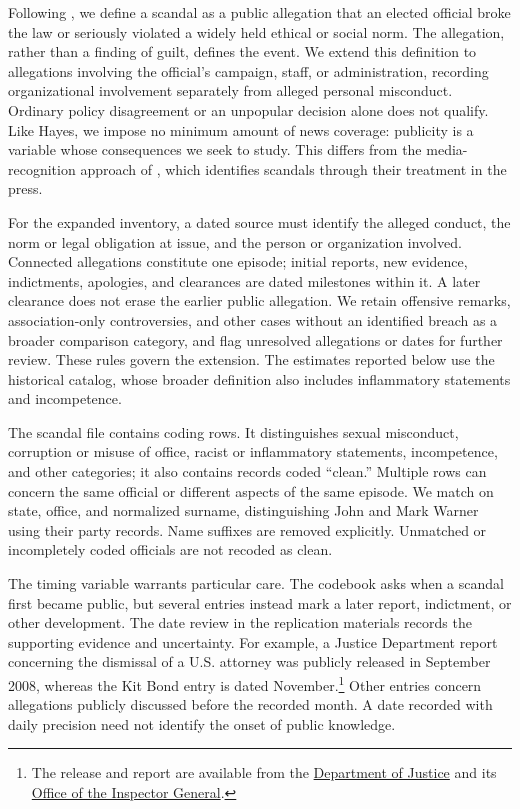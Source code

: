 \documentclass[11pt]{article}
\begin{document}
Following \citet{hayes2025}, we define a scandal as a public allegation that an elected official broke the law or seriously violated a widely held ethical or social norm. The allegation, rather than a finding of guilt, defines the event. We extend this definition to allegations involving the official's campaign, staff, or administration, recording organizational involvement separately from alleged personal misconduct. Ordinary policy disagreement or an unpopular decision alone does not qualify. Like Hayes, we impose no minimum amount of news coverage: publicity is a variable whose consequences we seek to study. This differs from the media-recognition approach of \citet{nyhan2017}, which identifies scandals through their treatment in the press.

For the expanded inventory, a dated source must identify the alleged conduct, the norm or legal obligation at issue, and the person or organization involved. Connected allegations constitute one episode; initial reports, new evidence, indictments, apologies, and clearances are dated milestones within it. A later clearance does not erase the earlier public allegation. We retain offensive remarks, association-only controversies, and other cases without an identified breach as a broader comparison category, and flag unresolved allegations or dates for further review. These rules govern the extension. The estimates reported below use the historical catalog, whose broader definition also includes inflammatory statements and incompetence.

The scandal file contains \CountRawCatalogRows{} coding rows. It distinguishes sexual misconduct, corruption or misuse of office, racist or inflammatory statements, incompetence, and other categories; it also contains records coded ``clean.'' Multiple rows can concern the same official or different aspects of the same episode. We match on state, office, and normalized surname, distinguishing John and Mark Warner using their party records. Name suffixes are removed explicitly. Unmatched or incompletely coded officials are not recoded as clean.

The timing variable warrants particular care. The codebook asks when a scandal first became public, but several entries instead mark a later report, indictment, or other development. The date review in the replication materials records the supporting evidence and uncertainty. For example, a Justice Department report concerning the dismissal of a U.S. attorney was publicly released in September 2008, whereas the Kit Bond entry is dated November.\footnote{The release and report are available from the \href{https://www.justice.gov/archive/opa/pr/2008/September/08-opa-859.html}{Department of Justice} and its \href{https://oig.justice.gov/sites/default/files/archive/special/s0809a/chapter4.htm}{Office of the Inspector General}.} Other entries concern allegations publicly discussed before the recorded month. A date recorded with daily precision need not identify the onset of public knowledge.
\end{document}
